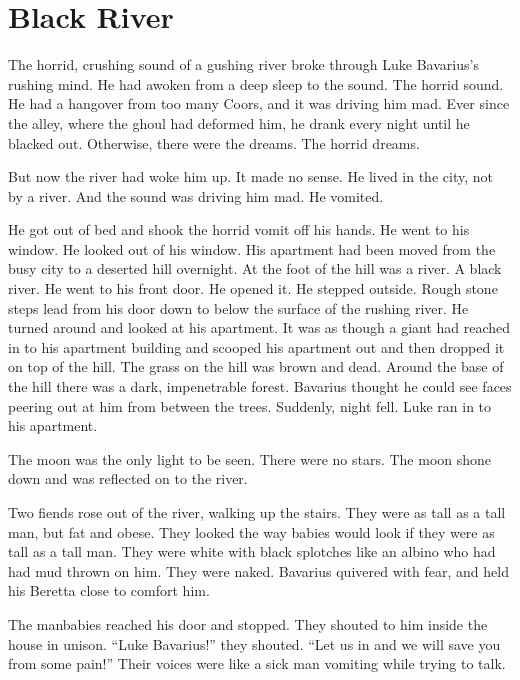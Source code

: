 \chapter{Black River}





The horrid, crushing sound of a gushing river broke through Luke
Bavarius's rushing mind. He had awoken from a deep sleep to the
sound. The horrid sound. He had a hangover from too many Coors, and
it was driving him mad. Ever since the alley, where the ghoul had
deformed him, he drank every night until he blacked out. Otherwise,
there were the dreams. The horrid dreams.

But now the river had woke him up. It made no sense. He lived in
the city, not by a river. And the sound was driving him mad. He
vomited.

He got out of bed and shook the horrid vomit off his hands. He went
to his window. He looked out of his window. His apartment had been
moved from the busy city to a deserted hill overnight. At the foot
of the hill was a river. A black river. He went to his front door.
He opened it. He stepped outside. Rough stone steps lead from his
door down to below the surface of the rushing river. He turned
around and looked at his apartment. It was as though a giant had
reached in to his apartment building and scooped his apartment out
and then dropped it on top of the hill. The grass on the hill was
brown and dead. Around the base of the hill there was a dark,
impenetrable forest. Bavarius thought he could see faces peering
out at him from between the trees. Suddenly, night fell. Luke ran
in to his apartment.

The moon was the only light to be seen. There were no stars. The
moon shone down and was reflected on to the river.

Two fiends rose out of the river, walking up the stairs. They were
as tall as a tall man, but fat and obese. They looked the way
babies would look if they were as tall as a tall man. They were
white with black splotches like an albino who had had mud thrown on
him. They were naked. Bavarius quivered with fear, and held his
Beretta close to comfort him.

The manbabies reached his door and stopped. They shouted to him
inside the house in unison. ``Luke Bavarius!'' they shouted. ``Let us
in and we will save you from some pain!'' Their voices were like a
sick man vomiting while trying to talk.

